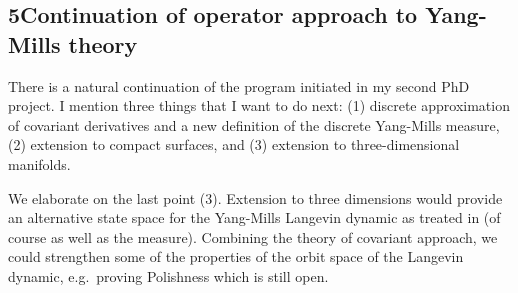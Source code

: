 \documentclass[12pt]{article}
\numberwithin{equation}{section}
\theoremstyle{definition}
\theoremstyle{remark}
\newcommand{\1}{\mathbf 1}
\newcommand{\<}{\langle}
\renewcommand{\>}{\rangle}
\begin{document}



\subsection*{5\quad Continuation of operator approach to Yang-Mills theory}\label{sec:ext_Dirac}
%
There is a natural continuation of the program initiated in my second PhD project. I mention three things that I want to do next: (1) discrete approximation of covariant derivatives and a new definition of the discrete Yang-Mills measure, (2) extension to compact surfaces, and (3) extension to three-dimensional manifolds.  %

We elaborate on the last point (3). Extension to three dimensions would provide an alternative state space for the Yang-Mills Langevin dynamic as treated in \cite{CCHS3d} (of course as well as the measure). Combining the theory of covariant approach, we could strengthen some of the properties of the orbit space of the Langevin dynamic, e.g.\ proving Polishness which is still open.   




\end{document}
